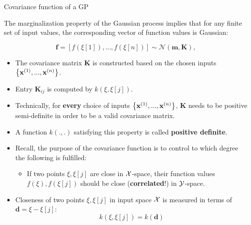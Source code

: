\documentclass[11pt,compress,t,notes=noshow, xcolor=table]{beamer}
\begin{document}

\begin{vbframe}{Covariance function of a GP}

  The marginalization property of the Gaussian process implies that for any finite set of input values, the corresponding vector of function values is Gaussian:

  $$
    \bm{f} = \left[f\left(\xi[1]\right), ..., f\left(\xi[n]\right)\right] \sim \mathcal{N}\left(\bm{m}, \bm{K}\right),
  $$ 


\begin{itemize}
  \item The covariance matrix $\bm{K}$ is constructed based on the chosen inputs $\left\{\mathbf{x}^{(1)}, ..., \mathbf{x}^{(n)}\right\}$.
  \item Entry $\bm{K}_{ij}$ is computed by $k\left(\xi, \xi[j]\right)$.
  \item Technically, for \textbf{every} choice of inputs $\left\{\mathbf{x}^{(1)}, ..., \mathbf{x}^{(n)}\right\}$, $\bm{K}$ needs to be positive semi-definite in order to be a valid covariance matrix.
  \item A function $k(.,.)$ satisfying this property is called \textbf{positive definite}.

\framebreak 

  \item Recall, the purpose of the covariance function is to control to which degree the following is fulfilled: \vspace*{0.4cm}
  \begin{itemize}
    \item[] If two points $\xi, \xi[j]$ are close in $\mathcal{X}$-space, their function values $f(\xi), f(\xi[j])$ should be close (\textbf{correlated}!) in $\mathcal{Y}$-space.
  \end{itemize} \vspace*{0.4cm}

  \item Closeness of two points $\xi, \xi[j]$ in input space $\mathcal{X}$ is measured in terms of $\bm{d} = \xi - \xi[j]$: 
  $$
    k(\xi, \xi[j]) = k(\bm{d})
  $$ 
\end{itemize}


\end{vbframe}
\end{document}
